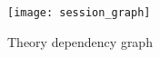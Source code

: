 \documentclass[10pt,a4paper]{article}
\begin{document}
\begin{figure}
\begin{center}
  \texttt{[image: session\_graph]}
\end{center}
\caption{Theory dependency graph}
\label{fig:thys}
\end{figure}



%
%



\end{document}

